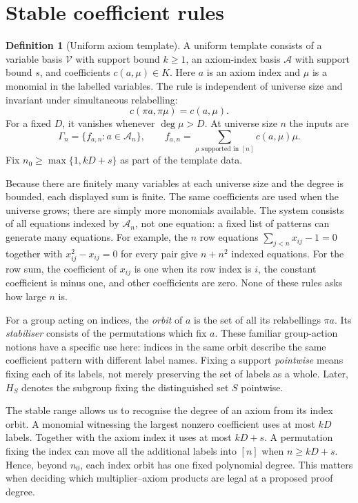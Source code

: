 \documentclass[11pt,a4paper,oneside,openany]{book}
\theoremstyle{definition}\newtheorem{definition}[theorem]{Definition}
\theoremstyle{remark}\newtheorem{remark}[theorem]{Remark}
\numberwithin{equation}{chapter}
\begin{document}
\section{Stable coefficient rules}
\begin{definition}[Uniform axiom template]\label{tx:def:template}
A uniform template consists of a variable basis $\mathcal V$ with
support bound $k\ge1$, an axiom-index basis $\mathcal A$ with support
bound $s$, and coefficients $c(a,\mu)\in K$. Here $a$ is an axiom
index and $\mu$ is a monomial in the labelled variables. The rule is
independent of universe size and invariant under simultaneous relabelling:
\[
                 c(\pi a,\pi\mu)=c(a,\mu).
\]
For a fixed $D$, it vanishes whenever $\deg\mu>D$. At universe size $n$ the
inputs are
\begin{equation}\label{tx:eq:template-instance}
 \Gamma_n=\{f_{a,n}:a\in\mathcal A_n\},\qquad
 f_{a,n}=\sum_{\mu\text{ supported in }[n]}c(a,\mu)\mu.
\end{equation}
Fix $n_0\ge\max\{1,kD+s\}$ as part of the template data.
\end{definition}

Because there are finitely many variables at each universe size and the degree
is bounded, each displayed sum is finite. The same coefficients are
used when the universe grows; there are simply more monomials available.
The system consists of all equations indexed by $\mathcal A_n$, not
one equation: a fixed list of patterns can generate many equations.
For example, the $n$ row equations $\sum_{j<n}x_{ij}-1=0$ together
with $x_{ij}^2-x_{ij}=0$ for every pair give $n+n^2$ indexed equations.
For the row sum, the coefficient of $x_{ij}$ is one when its row index
is $i$, the constant coefficient is minus one, and other coefficients
are zero. None of these rules asks how large $n$ is.

For a group acting on indices, the \emph{orbit} of $a$ is the set
of all its relabellings $\pi a$. Its \emph{stabiliser} consists of the
permutations which fix $a$. These familiar group-action notions have
a specific use here: indices in the same orbit describe the same
coefficient pattern with different label names. Fixing a support
\emph{pointwise} means fixing each of its labels, not merely preserving
the set of labels as a whole. Later, $H_S$ denotes the subgroup fixing
the distinguished set $S$ pointwise.

The stable range allows us to recognise the degree of an axiom from
its index orbit. A monomial witnessing the largest nonzero coefficient
uses at most $kD$ labels. Together with the axiom index it uses at most
$kD+s$. A permutation fixing the index can move all the additional
labels into $[n]$ when $n\ge kD+s$. Hence, beyond $n_0$, each index
orbit has one fixed polynomial degree. This matters when deciding which
multiplier--axiom products are legal at a proposed proof degree.
\end{document}
